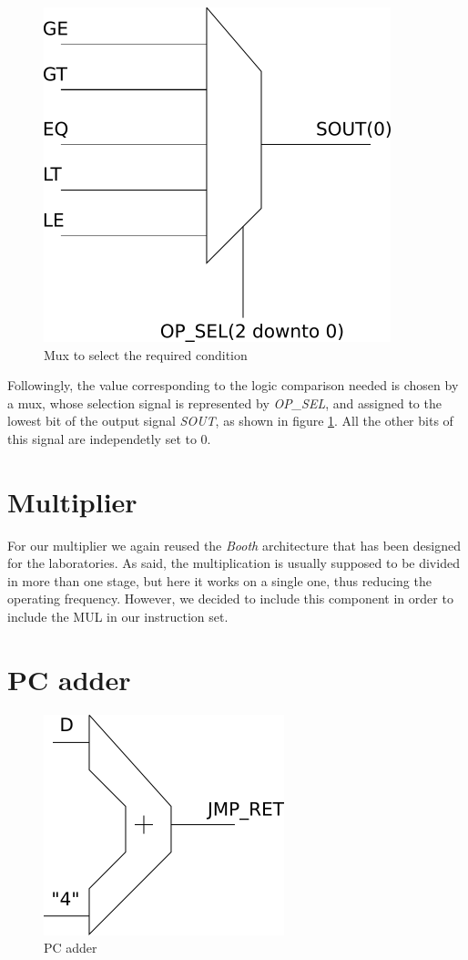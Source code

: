 \begin{figure}
	\centering
	\includegraphics[scale=0.6]{chapters/figures/comp_mux}
	\caption{Mux to select the required condition}
	\label{comp_mux_fig}
\end{figure}


Followingly, the value corresponding to the logic comparison needed is chosen by a mux, whose selection signal is represented by \textit{OP\_SEL}, and assigned to the lowest bit of the output signal \textit{SOUT}, as shown in figure \ref{comp_mux_fig}. All the other bits of this signal are independetly set to $0$.

\section{Multiplier}

For our multiplier we again reused the \textit{Booth} architecture that has been designed for the laboratories. As said, the multiplication is usually supposed to be divided in more than one stage, but here it works on a single one, thus reducing the operating frequency. However, we decided to include this component in order to include the MUL in our instruction set. 

\section{PC adder}
\noindent
\begin{figure}
	\begin{center}
		\includegraphics[scale=0.6]{chapters/figures/pc_add}
	\end{center}
	\caption{PC adder}
	\label{pc_add_fig}
\end{figure}

